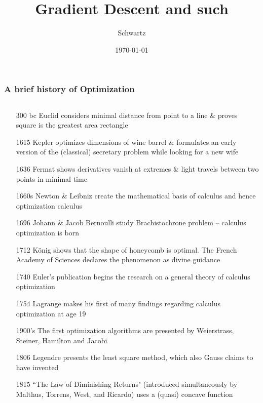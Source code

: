 \documentclass[xcolor={dvipsnames}]{beamer}
\title{Gradient Descent and such}
\author{Schwartz}
\date{\today}
\begin{document}
\frame{\titlepage}

\frame
{
 \frametitle{A brief history of Optimization}

\vspace{-.3cm}

\tiny
\begin{columns}
\begin{column}{.5\textwidth}

\vspace{-.1cm}

\begin{itemize}
\item[300 bc] Euclid considers minimal distance from point to a line
\& proves square is the greatest area rectangle 

\item[1615] Kepler optimizes dimensions of wine barrel \& formulates an early version of the (classical) secretary problem while looking for a new wife

\item[1636] Fermat shows derivatives vanish at extremes \& light travels between two points in minimal time

\item[1660s] Newton \& Leibniz create the mathematical basis of calculus 
and hence optimization calculus

\item[1696]  Johann \& Jacob Bernoulli study Brachistochrone problem -- calculus optimization is born

\item[1712] K\"{o}nig shows that the shape of honeycomb is optimal. The French Academy of Sciences declares the phenomenon as divine guidance

\item[1740] Euler's publication begins the research on a general theory of calculus optimization

\item[1754] Lagrange makes his first of many findings regarding calculus optimization at age 19 

\item[1900's] The first optimization algorithms are presented by Weierstrass, Steiner, Hamilton and Jacobi

\item[1806] Legendre presents the least square method, which also Gauss claims to have invented

\item[1815] ``The Law of Diminishing Returns" (introduced simultaneously by Malthus, Torrens, West, and Ricardo) uses a (quasi) concave function


\end{itemize}
\end{column}
\end{columns}}
\end{document}
